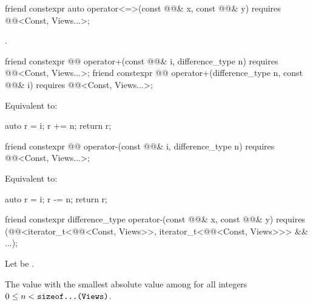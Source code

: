 \begin{itemdecl}
friend constexpr auto operator<=>(const @@& x, const @@& y)
  requires @@<Const, Views...>;
\end{itemdecl}

\begin{itemdescr}
\pnum
\returns
{}.
\end{itemdescr}

\begin{itemdecl}
friend constexpr @@ operator+(const @@& i, difference_type n)
  requires @@<Const, Views...>;
friend constexpr @@ operator+(difference_type n, const @@& i)
  requires @@<Const, Views...>;
\end{itemdecl}

\begin{itemdescr}
\pnum
\effects
Equivalent to:
\begin{codeblock}
auto r = i;
r += n;
return r;
\end{codeblock}
\end{itemdescr}

\begin{itemdecl}
friend constexpr @@ operator-(const @@& i, difference_type n)
  requires @@<Const, Views...>;
\end{itemdecl}

\begin{itemdescr}
\pnum
\effects
Equivalent to:
\begin{codeblock}
auto r = i;
r -= n;
return r;
\end{codeblock}
\end{itemdescr}

\begin{itemdecl}
friend constexpr difference_type operator-(const @@& x, const @@& y)
  requires (@@<iterator_t<@@<Const, Views>>,
                               iterator_t<@@<Const, Views>>> && ...);
\end{itemdecl}

\begin{itemdescr}
\pnum
Let  be .

\pnum
\returns
The value with the smallest absolute value among 
for all integers $0 \leq n < \texttt{\protect sizeof...(Views)}$.
\end{itemdescr}

